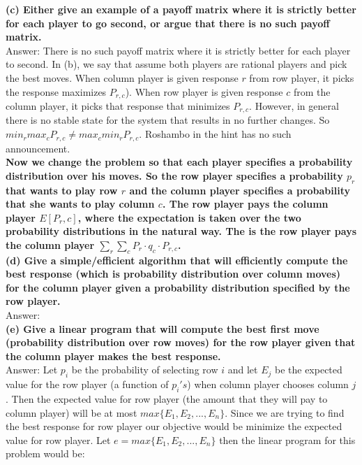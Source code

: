 \documentclass{article}
\begin{document}
\textbf{(c) Either give an example of a payoff matrix where it is strictly better for each player to go second, or argue that there is no such payoff matrix.} \\ \newline
Answer: There is no such payoff matrix where it is strictly better for each player to second. In (b), we say that assume both players are rational players and pick the best moves. When column player is given response $r$ from row player, it picks the response maximizes $P_{r,c}$). When row player is given response $c$ from the column player, it picks that response that minimizes $P_{r,c}$. However, in general there is no stable state for the system that results in no further changes. So $min_{r}max_{c}P_{r,c} \neq max_{c}min_{r}P_{r,c}$. Roshambo in the hint has no such announcement. \\\newline
\textbf{Now we change the problem so that each player specifies a probability distribution over his moves. So the row player specifies a probability $p_r$ that wants to play row $r$ and the column player specifies a probability  that she wants to play column $c$. The row player pays the column player $E[P_r,c]$, where the expectation is taken over the two probability distributions in the natural way. The is the row player pays the column player $\sum_r\sum_c P_r \cdot q_c \cdot P_{r,c}$.} \\ \newline
\textbf{(d) Give a simple/efficient algorithm that will efficiently compute the best response (which is probability distribution over column moves) for the column player given a probability distribution specified by the row player.} \\ \newline
Answer: \\ \newline
\textbf{(e) Give a linear program that will compute the best first move (probability distribution over row moves) for the row player given that the column player makes the best response.} \\ \newline
Answer: Let $p_i$ be the probability of selecting row $i$ and let $E_j$ be the expected value for the row player (a function of $p_i's$) when column player chooses column $j$. Then the expected value for row player (the amount that they will pay to column player) will be at most $max\{E_1, E_2,..., E_n\}$. Since we are trying to find the best response for row player our objective would be minimize the expected value for row player. Let $e = max\{E_1, E_2,..., E_n\}$ then the linear program for this problem would be: \\
\end{document}
